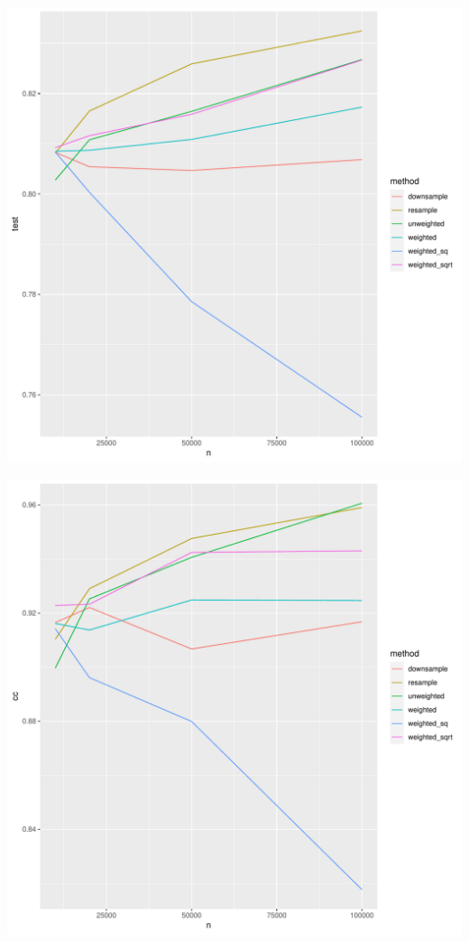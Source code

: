 \documentclass[12pt]{article}
\begin{document}
\begin{center}
\includegraphics[width=.9\textwidth]{aucs_large_test.pdf}
\end{center}

\begin{center}
\includegraphics[width=.9\textwidth]{aucs_large.pdf}
\end{center}
\end{document}
